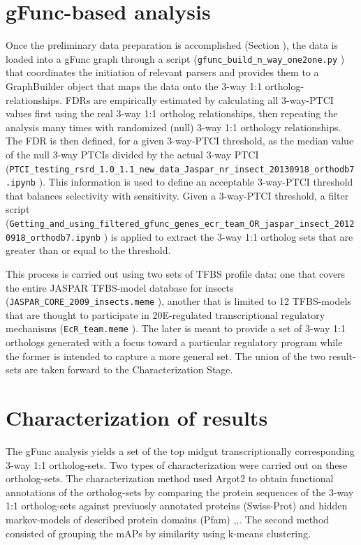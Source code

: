 \section{gFunc-based analysis}
Once the preliminary data preparation is accomplished (Section \label{sec:prelim-data}), the data is loaded into a \gls{gFunc} graph through a script (\texttt{gfunc\_build\_n\_way\_one2one.py} \cite{Dunn2013dissSupl}) that coordinates the initiation of relevant parsers and provides them to a GraphBuilder object that maps the data onto the 3-way 1:1 ortholog-relationships.
\glspl{FDR} are empirically estimated by calculating all 3-way-\gls{PTCI} values first using the real 3-way 1:1 ortholog relationships, then repeating the analysis many times with randomized (null) 3-way 1:1 orthology relationships.
The \gls{FDR} is then defined, for a given 3-way-\gls{PTCI} threshold, as the median value of the null 3-way \glspl{PTCI} divided by the actual 3-way \gls{PTCI} (\texttt{PTCI\_testing\_rsrd\_1.0\_1.1\_new\_data\_Jaspar\_nr\_insect\_20130918\_orthodb7.ipynb} \cite{Dunn2013dissSupl}).
This information is used to define an acceptable 3-way-\gls{PTCI} threshold that balances selectivity with sensitivity.
Given a 3-way-\gls{PTCI} threshold, a filter script (\texttt{Getting\_and\_using\_filtered\_gfunc\_genes\_ecr\_team\_OR\_jaspar\_insect\_20120918\_orthodb7.ipynb} \cite{Dunn2013dissSupl}) is applied to extract the 3-way 1:1 ortholog sets that are greater than or equal to the threshold.

This process is carried out using two sets of \gls{TFBS} profile data: one that covers the entire JASPAR \gls{TFBS}-model database for insects (\texttt{JASPAR\_CORE\_2009\_insects.meme}  \cite{Dunn2013dissSupl}), another that is limited to 12 \gls{TFBS}-models that are thought to participate in \gls{20E}-regulated transcriptional regulatory mechanisms (\texttt{EcR\_team.meme} \cite{Dunn2013dissSupl}).
The later is meant to provide a set of 3-way 1:1 orthologs generated with a focus toward a particular regulatory program while the former is intended to capture a more general set.
The union of the two result-sets are taken forward to the Characterization Stage.



\section{Characterization of results} \label{chap:3-sec:characterization-of-results}
The \gls{gFunc} analysis yields a set of the top midgut transcriptionally corresponding 3-way 1:1 ortholog-sets.
Two types of characterization were carried out on these ortholog-sets.
The characterization method used \gls{Argot2} to obtain functional annotations of the ortholog-sets by comparing the protein sequences of the 3-way 1:1 ortholog-sets against previuosly annotated proteins (\gls{Swiss-Prot}) and hidden markov-models of described protein domains (\gls{Pfam}) \cite{Boeckmann},\cite{Punta2012},\cite{Falda2012}.
The second method consisted of grouping the \glspl{mAP} by similarity using k-means clustering.

